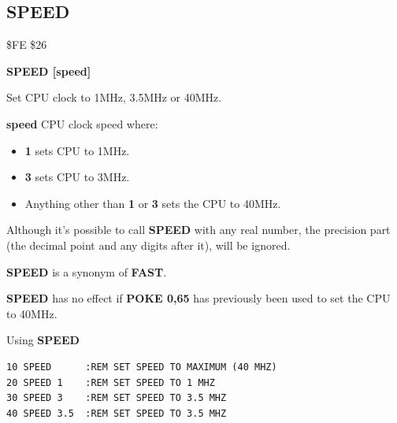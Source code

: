\subsection{SPEED}
\begin{description}[leftmargin=2cm,style=nextline]
\item [Token:] \$FE \$26
\item [Format:] {\bf SPEED [speed]}
\item [Usage:] Set CPU clock to 1MHz, 3.5MHz or 40MHz.

               {\bf speed} CPU clock speed where:
               \begin{itemize}
                   \item {\bf 1} sets CPU to 1MHz.
                   \item {\bf 3} sets CPU to 3MHz.
                   \item Anything other than {\bf 1} or {\bf 3} sets the CPU to 40MHz.
               \end{itemize}
\item [Remarks:] Although it's possible to call {\bf SPEED}
                 with any real number, the precision part (the decimal point
                 and any digits after it), will be ignored.

                {\bf SPEED} is a synonym of {\bf FAST}.

                {\bf SPEED} has no effect if {\bf POKE 0,65}
                has previously been used to set the CPU to 40MHz.

\item [Example:] Using {\bf SPEED}
\begin{tcolorbox}[colback=black,coltext=white]
\verbatimfont{\codefont}
\begin{verbatim}
10 SPEED      :REM SET SPEED TO MAXIMUM (40 MHZ)
20 SPEED 1    :REM SET SPEED TO 1 MHZ
30 SPEED 3    :REM SET SPEED TO 3.5 MHZ
40 SPEED 3.5  :REM SET SPEED TO 3.5 MHZ
\end{verbatim}
\end{tcolorbox}
\end{description}


\newpage
